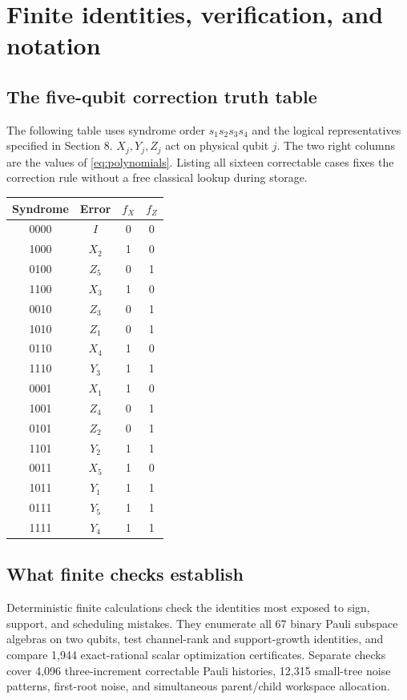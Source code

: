 \documentclass[11pt,a4paper]{article}
\numberwithin{equation}{section}
\theoremstyle{remark}\newtheorem*{remark}{Interpretation}
\begin{document}
\clearpage
\appendix
\section{Finite identities, verification, and notation}
\subsection{The five-qubit correction truth table}
The following table uses syndrome order $s_1s_2s_3s_4$ and the logical representatives specified in Section 8. $X_j,Y_j,Z_j$ act on physical qubit $j$. The two right columns are the values of \eqref{eq:polynomials}. Listing all sixteen correctable cases fixes the correction rule without a free classical lookup during storage.

\begin{center}
\begin{tabular}{@{}cccc@{}}
\toprule
Syndrome & Error & $f_X$ & $f_Z$\\
\midrule
0000 & $I$ & 0 & 0\\
1000 & $X_2$ & 1 & 0\\
0100 & $Z_5$ & 0 & 1\\
1100 & $X_3$ & 1 & 0\\
0010 & $Z_3$ & 0 & 1\\
1010 & $Z_1$ & 0 & 1\\
0110 & $X_4$ & 1 & 0\\
1110 & $Y_3$ & 1 & 1\\
0001 & $X_1$ & 1 & 0\\
1001 & $Z_4$ & 0 & 1\\
0101 & $Z_2$ & 0 & 1\\
1101 & $Y_2$ & 1 & 1\\
0011 & $X_5$ & 1 & 0\\
1011 & $Y_1$ & 1 & 1\\
0111 & $Y_5$ & 1 & 1\\
1111 & $Y_4$ & 1 & 1\\
\bottomrule
\end{tabular}
\end{center}

\subsection{What finite checks establish}
Deterministic finite calculations check the identities most exposed to sign, support, and scheduling mistakes. They enumerate all 67 binary Pauli subspace algebras on two qubits, test channel-rank and support-growth identities, and compare 1,944 exact-rational scalar optimization certificates. Separate checks cover 4,096 three-increment correctable Pauli histories, 12,315 small-tree noise patterns, first-root noise, and simultaneous parent/child workspace allocation.
\end{document}
